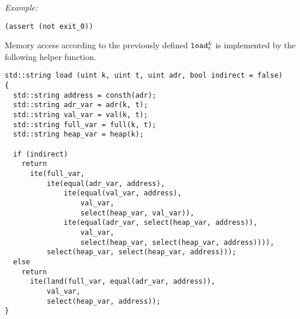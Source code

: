 \noindent
\emph{Example:} 

\begin{lstlisting}[style=smtlib]
(assert (not exit_0))
\end{lstlisting}



\noindent
Memory access according to the previously defined $\texttt{load}^k_t$ is implemented by the following helper function.

\begin{lstlisting}[style=c++]
std::string load (uint k, uint t, uint adr, bool indirect = false)
{
  std::string address = consth(adr);
  std::string adr_var = adr(k, t);
  std::string val_var = val(k, t);
  std::string full_var = full(k, t);
  std::string heap_var = heap(k);

  if (indirect)
    return
      ite(full_var,
          ite(equal(adr_var, address),
              ite(equal(val_var, address),
                  val_var,
                  select(heap_var, val_var)),
              ite(equal(adr_var, select(heap_var, address)),
                  val_var,
                  select(heap_var, select(heap_var, address)))),
          select(heap_var, select(heap_var, address)));
  else
    return
      ite(land(full_var, equal(adr_var, address)),
          val_var,
          select(heap_var, address));
}
\end{lstlisting}

